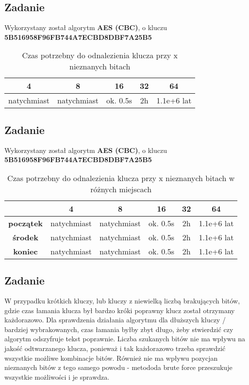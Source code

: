 \documentclass{article}
\begin{document}
\subsection{Zadanie}
Wykorzystany został algorytm \textbf{AES (CBC)}, o kluczu \textbf{5B516958F96FB744A7ECBD8DBF7A25B5}

\begin{table}[H]
    \centering
    \caption{Czas potrzebny do odnalezienia klucza przy x nieznanych bitach}
    \begin{tabular}{|c|c|c|c|c|}
        \hline
        \textbf{4}  & \textbf{8}  & \textbf{16} & \textbf{32} & \textbf{64} \\ \hline
        natychmiast & natychmiast & ok. 0.5s    & 2h          & 1.1e+6 lat  \\ \hline
    \end{tabular}
\end{table}
\subsection{Zadanie}
Wykorzystany został algorytm \textbf{AES (CBC)}, o kluczu \textbf{5B516958F96FB744A7ECBD8DBF7A25B5}
\begin{table}[H]
    \centering
    \caption{Czas potrzebny do odnalezienia klucza przy x nieznanych bitach w różnych miejscach}
    \begin{tabular}{|c|c|c|c|c|c|}
        \hline
                          & \textbf{4}  & \textbf{8}  & \textbf{16} & \textbf{32} & \textbf{64} \\ \hline
        \textbf{początek} & natychmiast & natychmiast & ok. 0.5s    & 2h          & 1.1e+6 lat  \\ \hline
        \textbf{środek}   & natychmiast & natychmiast & ok. 0.5s    & 2h          & 1.1e+6 lat  \\ \hline
        \textbf{koniec}   & natychmiast & natychmiast & ok. 0.5s    & 2h          & 1.1e+6 lat  \\ \hline
    \end{tabular}
\end{table}
\subsection{Zadanie}
W przypadku krótkich kluczy, lub kluczy z niewielką liczbą brakujących bitów, gdzie czas łamania klucza był bardzo króki poprawny klucz został otrzymany każdorazowo.
Dla sprawdzenia działania algorytmu dla dłuższych kluczy / bardziej wybrakowanych, czas łamania byłby zbyt długo, żeby stwierdzić czy algorytm odszyfruje tekst poprawnie. Liczba szukanych bitów nie ma wpływu na jakość
odtwarzanego klucza, ponieważ i tak każdorazowo trzeba sprawdzić wszystkie możliwe kombinacje bitów. Również nie ma wpływu pozycjan nieznanych bitów z tego samego powodu - metododa brute force przeszukuje wszystkie możliwości i je sprawdza.
\end{document}
